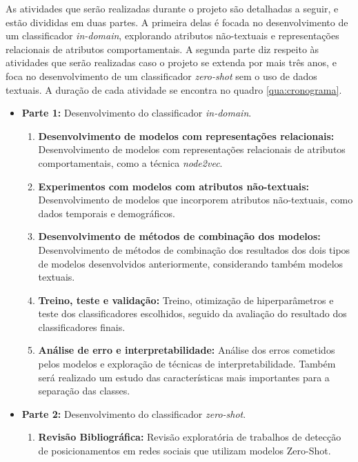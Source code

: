 \documentclass[
	12pt, oneside, a4paper, english, brazil
]{abntex2ppgsi}
\begin{document}
As atividades que serão realizadas durante o projeto são detalhadas a seguir, e estão divididas em duas partes. A primeira delas é focada no desenvolvimento de um classificador {\em in-domain}, explorando atributos não-textuais e representações relacionais de atributos comportamentais. A segunda parte diz respeito às atividades que serão realizadas caso o projeto se extenda por mais três anos, e foca no desenvolvimento de um classificador {\em zero-shot} sem o uso de dados textuais. A duração de cada atividade se encontra no quadro \ref{qua:cronograma}.

\begin{itemize}
    \item \textbf{Parte 1:} Desenvolvimento do classificador {\em in-domain}.
    \begin{enumerate}    
        \item \textbf{Desenvolvimento de modelos com representações relacionais:} Desenvolvimento de modelos com representações relacionais de atributos comportamentais, como a técnica {\em node2vec}.
    
        \item \textbf{Experimentos com modelos com atributos não-textuais:} Desenvolvimento de modelos que incorporem atributos não-textuais, como dados temporais e demográficos.
    
        \item \textbf{Desenvolvimento de métodos de combinação dos modelos:} Desenvolvimento de métodos de combinação dos resultados dos dois tipos de modelos desenvolvidos anteriormente, considerando também modelos textuais.
    
        \item \textbf{Treino, teste e validação:} Treino, otimização de hiperparâmetros e teste dos classificadores escolhidos, seguido da avaliação do resultado dos classificadores finais.
    
        \item \textbf{Análise de erro e interpretabilidade:} Análise dos erros cometidos pelos modelos e exploração de técnicas de interpretabilidade. Também será realizado um estudo das características mais importantes para a separação das classes.

    \end{enumerate}
    \item \textbf{Parte 2:} Desenvolvimento do classificador {\em zero-shot}.
    \begin{enumerate}
        \item \textbf{Revisão Bibliográfica:} Revisão exploratória de trabalhos de detecção de posicionamentos em redes sociais que utilizam modelos Zero-Shot.
    

\end{enumerate}
\end{itemize}
\end{document}

